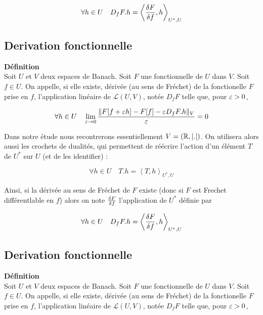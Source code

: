 \documentclass[10pt]{article}
\begin{document}
\begin{multicols}{2}
\begin{equation}
  \forall h \in U \quad D_fF.h = \left< \frac{\delta F}{\delta f}, h \right>_{U^*, U}
\end{equation}

\vspace*{11pt}
\vspace*{11pt}
\subsection{Derivation fonctionnelle}


\textbf{Définition}\\
Soit $U$ et $V$ deux espaces de Banach. Soit $F$ une fonctionnelle de $U$ dans $V$. 
Soit $f \in U$. On appelle, si elle existe, dérivée (au sens de Fréchet) de la fonctionelle $F$ prise en $f$, l'application linéaire de $\mathcal{L}(U,V)$, notée $D_fF$ telle que, pour $\varepsilon>0$, 

\begin{equation}
\forall h \in U \quad \lim_{ \varepsilon \rightarrow 0 } \frac{\| F[f+\varepsilon h] - F[f] - \varepsilon D_fF.h\|_V}{\varepsilon}  = 0
\end{equation} 


Dans notre étude nous recontrerons essentiellement $V = (\mathbb{R}, |.|)$. On utilisera alors aussi les crochets de dualités, qui permettent de réécrire l'action d'un élément $T$ de $U^*$ sur $U$ (et de les identifier) : 

\begin{equation}
  \forall h \in U \quad T.h = \left< T, h \right>_{U^*, U}
\end{equation}

Ainsi, si la dérivée au sens de Fréchet de $F$ existe (donc si $F$ est Frechet différentlable en $f$) alors on note $\frac{\delta F}{\delta f}$ l'application de $U^*$ définie par 

\begin{equation}
  \forall h \in U \quad D_fF.h = \left< \frac{\delta F}{\delta f}, h \right>_{U^*, U}
\end{equation}

\vspace*{11pt}
\vspace*{11pt}
\subsection{Derivation fonctionnelle}


\textbf{Définition}\\
Soit $U$ et $V$ deux espaces de Banach. Soit $F$ une fonctionnelle de $U$ dans $V$. 
Soit $f \in U$. On appelle, si elle existe, dérivée (au sens de Fréchet) de la fonctionelle $F$ prise en $f$, l'application linéaire de $\mathcal{L}(U,V)$, notée $D_fF$ telle que, pour $\varepsilon>0$, 


\end{multicols}
\end{document}
